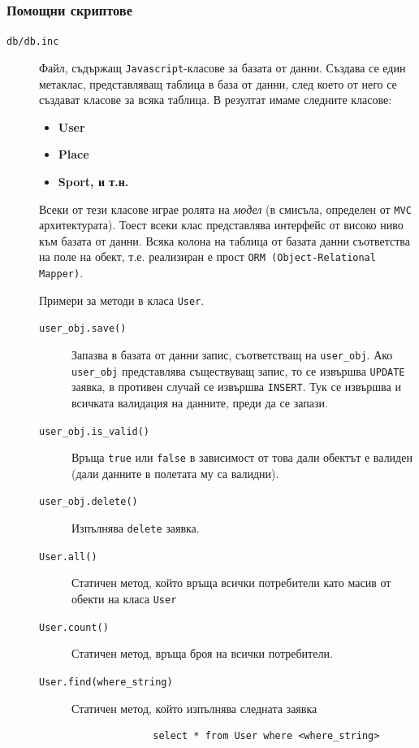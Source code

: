 \documentclass[a4paper,10pt, leqno]{article}
\newcommand{\tab}[1] {\textbf{#1}}
\newcommand{\File}[1] {\texttt{#1}}
\begin{document}
		\subsubsection{Помощни скриптове}
		\begin{description}
		  \item[\File{db/db.inc}] Файл, съдържащ \texttt{Javascript}-класове за базата от данни.
		    Създава се един метаклас, представляващ таблица в база от данни,
		    след което от него се създават класове за всяка таблица. В резултат имаме следните класове:
		    \begin{itemize}
		      \item \tab{User}
		      \item \tab{Place}
		      \item \tab{Sport, и т.н.}
		    \end{itemize}
		    Всеки от тези класове играе ролята на \textit{модел} (в смисъла, определен от \texttt{MVC} архитектурата).
		    Тоест всеки клас представлява интерфейс от високо ниво към базата от данни. Всяка колона на таблица 
		    от базата данни съответства на поле на обект, т.е. реализиран е прост \texttt{ORM (Object-Relational Mapper)}.
		    
		    Примери за методи в класа \texttt{User}.
		    \begin{description}
		      \item[\texttt{user\_obj.save()}] Запазва в базата от данни запис, съответстващ на \texttt{user\_obj}. Ако
			\texttt{user\_obj} представлява съществуващ запис, то се извършва \texttt{UPDATE} заявка, в противен случай
			се извършва \texttt{INSERT}. Тук се извършва и всичката валидация на данните, преди да се запази.
		      \item[\texttt{user\_obj.is\_valid()}] Връща \texttt{true} или \texttt{false} в зависимост от това дали
			обектът е валиден (дали данните в полетата му са валидни).

		      \item[\texttt{user\_obj.delete()}] Изпълнява \texttt{delete} заявка.
		      \item[\texttt{User.all()}] Статичен метод, който връща всички потребители като масив от обекти на класа \texttt{User}
		      \item[\texttt{User.count()}] Статичен метод, връща броя на всички потребители.
		      \item[\texttt{User.find(where\_string)}] Статичен метод, който изпълнява следната заявка
			\begin{verbatim}
			  select * from User where <where_string>
			\end{verbatim}
		    \end{description}


\end{description}
\end{document}
